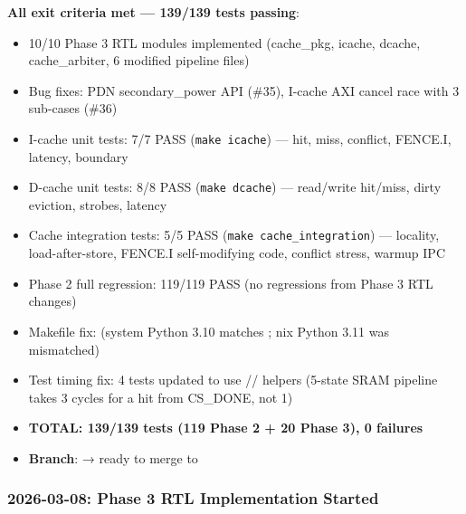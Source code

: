 \begin{record}

\textbf{All exit criteria met --- 139/139 tests passing}:

\begin{itemize}
\tightlist
\item
  \ok{} 10/10 Phase 3 RTL modules implemented (cache\_\allowbreak{}pkg,
  icache, dcache, cache\_\allowbreak{}arbiter, 6 modified pipeline
  files)
\item
  \ok{} Bug fixes: PDN secondary\_\allowbreak{}power API (\#35), I-cache
  AXI cancel race with 3 sub-cases (\#36)
\item
  \ok{} I-cache unit tests: 7/7 PASS (\texttt{make\ icache}) --- hit,
  miss, conflict, FENCE.I, latency, boundary
\item
  \ok{} D-cache unit tests: 8/8 PASS (\texttt{make\ dcache}) ---
  read/\allowbreak{}write hit/miss, dirty eviction, strobes, latency
\item
  \ok{} Cache integration tests: 5/5 PASS
  (\texttt{make\ cache\_\allowbreak{}integration}) --- locality,
  load-after-store, FENCE.I self-modifying code, conflict stress, warmup
  IPC
\item
  \ok{} Phase 2 full regression: 119/119 PASS (no regressions from Phase
  3 RTL changes)
\item
  \ok{} Makefile fix:  (system Python
  3.10 matches ; nix Python 3.11 was mismatched)
\item
  \ok{} Test timing fix: 4 tests updated to use
  // helpers (5-state SRAM
  pipeline takes 3 cycles for a hit from CS\_DONE, not 1)
\item
  \textbf{TOTAL: 139/139 tests (119 Phase 2 + 20 Phase 3), 0 failures}
\item
  \textbf{Branch}:  → ready to merge to 
\end{itemize}

\end{record}

\subsubsection{2026-03-08: Phase 3 RTL Implementation Started}\label{cr:status:phase-status:2026-03-08-phase-3-rtl-implementation-started}

